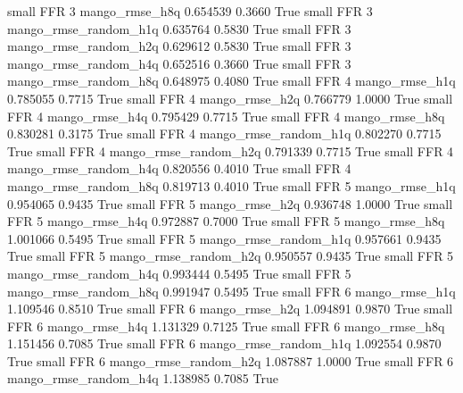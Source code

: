      small      FFR                 3        mango_rmse_h8q      0.654539      0.3660    True
     small      FFR                 3 mango_rmse_random_h1q      0.635764      0.5830    True
     small      FFR                 3 mango_rmse_random_h2q      0.629612      0.5830    True
     small      FFR                 3 mango_rmse_random_h4q      0.652516      0.3660    True
     small      FFR                 3 mango_rmse_random_h8q      0.648975      0.4080    True
     small      FFR                 4        mango_rmse_h1q      0.785055      0.7715    True
     small      FFR                 4        mango_rmse_h2q      0.766779      1.0000    True
     small      FFR                 4        mango_rmse_h4q      0.795429      0.7715    True
     small      FFR                 4        mango_rmse_h8q      0.830281      0.3175    True
     small      FFR                 4 mango_rmse_random_h1q      0.802270      0.7715    True
     small      FFR                 4 mango_rmse_random_h2q      0.791339      0.7715    True
     small      FFR                 4 mango_rmse_random_h4q      0.820556      0.4010    True
     small      FFR                 4 mango_rmse_random_h8q      0.819713      0.4010    True
     small      FFR                 5        mango_rmse_h1q      0.954065      0.9435    True
     small      FFR                 5        mango_rmse_h2q      0.936748      1.0000    True
     small      FFR                 5        mango_rmse_h4q      0.972887      0.7000    True
     small      FFR                 5        mango_rmse_h8q      1.001066      0.5495    True
     small      FFR                 5 mango_rmse_random_h1q      0.957661      0.9435    True
     small      FFR                 5 mango_rmse_random_h2q      0.950557      0.9435    True
     small      FFR                 5 mango_rmse_random_h4q      0.993444      0.5495    True
     small      FFR                 5 mango_rmse_random_h8q      0.991947      0.5495    True
     small      FFR                 6        mango_rmse_h1q      1.109546      0.8510    True
     small      FFR                 6        mango_rmse_h2q      1.094891      0.9870    True
     small      FFR                 6        mango_rmse_h4q      1.131329      0.7125    True
     small      FFR                 6        mango_rmse_h8q      1.151456      0.7085    True
     small      FFR                 6 mango_rmse_random_h1q      1.092554      0.9870    True
     small      FFR                 6 mango_rmse_random_h2q      1.087887      1.0000    True
     small      FFR                 6 mango_rmse_random_h4q      1.138985      0.7085    True
